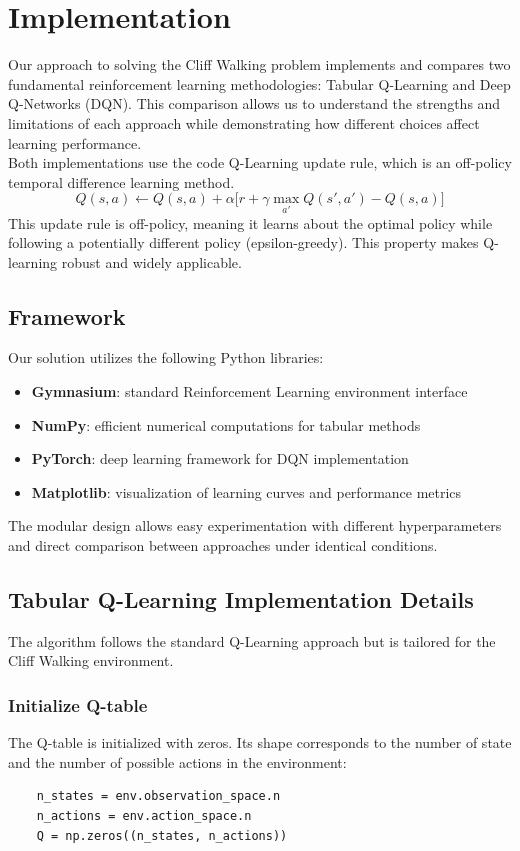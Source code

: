 \documentclass[a4paper,12pt]{article}
\begin{document}
\section{Implementation}
Our approach to solving the Cliff Walking problem implements and compares two fundamental reinforcement learning methodologies: Tabular Q-Learning and Deep Q-Networks (DQN). This comparison allows us to understand the strengths and limitations of each approach while demonstrating how different choices affect learning performance.
\vspace{0,5cm}\\
Both implementations use the code Q-Learning update rule, which is an off-policy temporal difference learning method.
$$Q(s,a) \leftarrow Q(s,a) + \alpha \big[r + \gamma \max_{a'} Q(s',a') - Q(s,a)\big]$$
This update rule is off-policy, meaning it learns about the optimal policy while following a potentially different policy (epsilon-greedy). This property makes Q-learning robust and widely applicable.
\subsection{Framework}
Our solution utilizes the following Python libraries:
\begin{itemize}
    \item \textbf{Gymnasium}: standard Reinforcement Learning environment interface
    \item \textbf{NumPy}: efficient numerical computations for tabular methods
    \item \textbf{PyTorch}: deep learning framework for DQN implementation
    \item \textbf{Matplotlib}: visualization of learning curves and performance metrics
\end{itemize}
The modular design allows easy experimentation with different hyperparameters and direct comparison between approaches under identical conditions.
\subsection{Tabular Q-Learning Implementation Details}
The algorithm follows the standard Q-Learning approach but is tailored for the Cliff Walking environment.
\subsubsection{Initialize Q-table}
The Q-table is initialized with zeros. Its shape corresponds to the number of state and the number of possible actions in the environment:
\begin{lstlisting}
    n_states = env.observation_space.n
    n_actions = env.action_space.n
    Q = np.zeros((n_states, n_actions))
\end{lstlisting}
\end{document}
